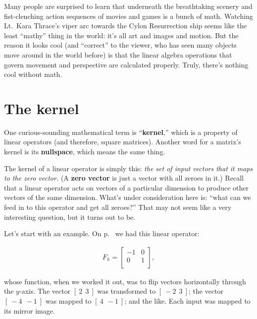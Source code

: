 
Many people are surprised to learn that underneath the breathtaking scenery and
fist-clenching action sequences of movies and games is a bunch of math.
Watching Lt.~Kara Thrace's viper arc towards the Cylon Resurrection ship seems
like the least ``mathy'' thing in the world: it's all art and images and
motion. But the reason it looks cool (and ``correct'' to the viewer, who has
seen many objects move around in the world before) is that the linear algebra
operations that govern movement and perspective are calculated properly. Truly,
there's nothing cool without math.

\label{endLinearOps}


\section{The kernel}


One curious-sounding mathematical term is ``\textbf{kernel},'' which is a
property of linear operators (and therefore, square matrices). Another word for
a matrix's kernel is its \textbf{nullspace}, which means the same thing.


The kernel of a linear operator is simply this: \textit{the set of input
vectors that it maps to the zero vector.} (A \textbf{zero vector} is just a
vector with all zeroes in it.) Recall that a linear operator acts on vectors of
a particular dimension to produce other vectors of the same dimension. What's
under consideration here is: ``what can we feed in to this operator and get all
zeroes?'' That may not seem like a very interesting question, but it turns out
to be.

Let's start with an example. On p.~\pageref{flipOperator} we had this linear
operator:

\vspace{-.15in}
\begin{align*}
F_{h} =
\begin{bmatrix}
-1 & 0 \\
0 & 1 \\
\end{bmatrix},
\end{align*}
\vspace{-.15in}

whose function, when we worked it out, was to flip vectors horizontally through
the $y$-axis. The vector $[\ 2\ \ 3\ ]$ was transformed to $[\ -2\ \ 3\ ]$; the
vector $[\ -4\ \ -1\ ]$ was mapped to $[\ 4\ \ -1\ ]$; and the like. Each input
was mapped to its mirror image.

